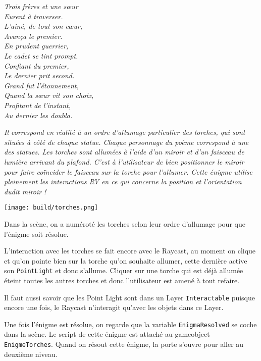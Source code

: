 \documentclass[12pt]{article}
\begin{document}
\begin{center}
    \textit{Trois frères et une sœur \\
    Eurent à traverser. \\
    L'aîné, de tout son cœur, \\
    Avança le premier. \\
    En prudent guerrier, \\
    Le cadet se tint prompt. \\
    Confiant du premier, \\
    Le dernier prit second. \\
    Grand fut l’étonnement, \\
    Quand la sœur vit son choix, \\
    Profitant de l’instant, \\
    Au dernier les doubla.}
\end{center}

\textit{Il correspond en réalité à un ordre d’allumage particulier des torches, qui sont situées à côté de chaque statue. Chaque personnage du poème correspond à une des statues. Les torches sont allumées à l’aide d’un miroir et d’un faisceau de lumière arrivant du plafond. C’est à l’utilisateur de bien positionner le miroir pour faire coïncider le faisceau sur la torche pour l’allumer. Cette énigme utilise pleinement les interactions RV en ce qui concerne la position et l’orientation dudit miroir !}

\begin{center}
    \texttt{[image: build/torches.png]}
\end{center}

Dans la scène, on a numéroté les torches selon leur ordre d’allumage pour que l’énigme soit résolue.

L’interaction avec les torches se fait encore avec le Raycast, au moment on clique et qu’on pointe bien sur la torche qu’on souhaite allumer, cette dernière active son \verb!PointLight! et donc s’allume. Cliquer sur une torche qui est déjà allumée éteint toutes les autres torches et donc l’utilisateur est amené à tout refaire.

Il faut aussi savoir que les Point Light sont dans un Layer \verb!Interactable! puisque encore une fois, le Raycast n’interagit qu’avec les objets dans ce Layer.

Une fois l’énigme est résolue, on regarde que la variable \verb!EnigmaResolved! se coche dans la scène. Le script de cette énigme est attaché au gameobject \verb!EnigmeTorches!. Quand on résout cette énigme, la porte s'ouvre pour aller au deuxième niveau.
\end{document}
